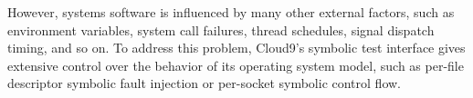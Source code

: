 However, systems software is influenced by many other external factors, such as environment variables, system call failures, thread schedules, signal dispatch timing, and so on.
%
To address this problem, Cloud9's symbolic test interface gives extensive control over the behavior of its operating system model, such as per-file descriptor symbolic fault injection or per-socket symbolic control flow.

